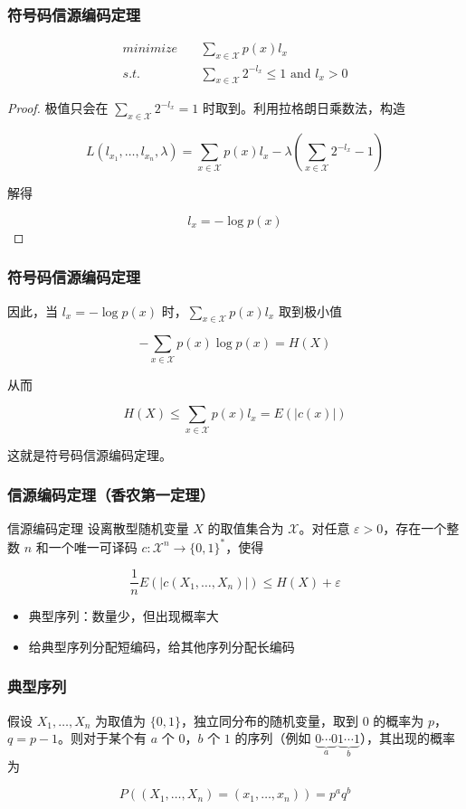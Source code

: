 \documentclass{beamer}
\begin{document}
\begin{frame}
    \frametitle{符号码信源编码定理}

        \[\begin{split}
            minimize & \quad \sum_{x\in\mathcal{X}}p(x)l_x \\
            s.t. & \quad \sum_{x\in\mathcal{X}} 2^{-l_x} \leq 1 \text{ and } l_x > 0
        \end{split}\]

    \begin{proof}
        极值只会在 $\sum_{x\in\mathcal{X}} 2^{-l_x} = 1$ 时取到。利用拉格朗日乘数法，构造

        \[L(l_{x_1}, \dots, l_{x_n}, \lambda) = \sum_{x\in\mathcal{X}} p(x)l_x - \lambda\left(\sum_{x\in\mathcal{X}}2^{-l_x}-1\right)\]
        
        解得

        \[l_x = -\log p(x)\]

    \end{proof}

\end{frame}

\begin{frame}
    \frametitle{符号码信源编码定理}
    
    因此，当 $l_x = -\log p(x)$ 时，$\sum_{x\in\mathcal{X}}p(x)l_x$ 取到极小值

    \[-\sum_{x\in\mathcal{X}}p(x)\log p(x) = H(X)\]

    从而

    \[H(X) \leq \sum_{x\in\mathcal{X}}p(x)l_x = E(\lvert c(x)\rvert)\]

    这就是符号码信源编码定理。

\end{frame}

\begin{frame}
    \frametitle{信源编码定理（香农第一定理）}

    \begin{block}{信源编码定理}
        设离散型随机变量 $X$ 的取值集合为 $\mathcal{X}$。对任意 $\varepsilon > 0$，存在一个整数 $n$ 和一个唯一可译码 $c: \mathcal{X}^n \rightarrow \{0, 1\}^*$，使得

        \[\frac{1}{n}E(\lvert c(X_1, \dots, X_n)\rvert) \leq H(X) + \varepsilon\]
    \end{block}

    \begin{itemize}
        \item 典型序列：数量少，但出现概率大
        \item 给典型序列分配短编码，给其他序列分配长编码
    \end{itemize}

\end{frame}

\begin{frame}
    \frametitle{典型序列}

    假设 $X_1, \dots, X_n$ 为取值为 $\{0, 1\}$，独立同分布的随机变量，取到 $0$ 的概率为 $p$，$q = p - 1$。则对于某个有 $a$ 个 $0$，$b$ 个 $1$ 的序列（例如 $\underbrace{0\cdots 0}_{a} \underbrace{1\cdots 1}_{b}$），其出现的概率为

    \[P((X_1, \dots, X_n) = (x_1, \dots, x_n)) = p^a q^b\]

\end{frame}
\end{document}

